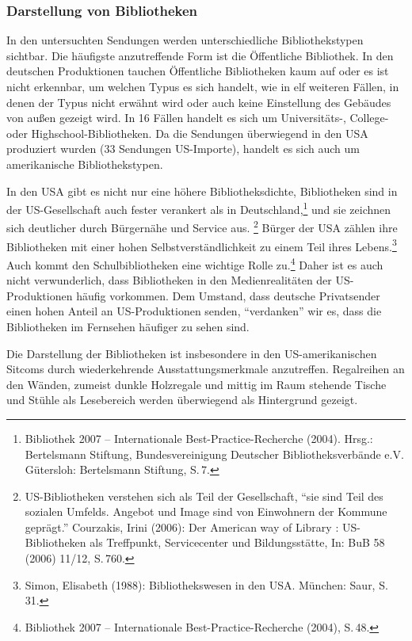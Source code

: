 \subsubsection{Darstellung von
Bibliotheken}\label{darstellung-von-bibliotheken}

In den untersuchten Sendungen werden unterschiedliche Bibliothekstypen
sichtbar. Die häufigste anzutreffende Form ist die Öffentliche
Bibliothek. In den deutschen Produktionen tauchen Öffentliche
Bibliotheken kaum auf oder es ist nicht erkennbar, um welchen Typus es
sich handelt, wie in elf weiteren Fällen, in denen der Typus nicht
erwähnt wird oder auch keine Einstellung des Gebäudes von außen gezeigt
wird. In 16 Fällen handelt es sich um Universitäts-, College- oder
Highschool-Bibliotheken. Da die Sendungen überwiegend in den USA
produziert wurden (33 Sendungen US-Importe), handelt es sich auch um
amerikanische Bibliothekstypen.

In den USA gibt es nicht nur eine höhere Bibliotheksdichte, Bibliotheken
sind in der US-Gesellschaft auch fester verankert als in
Deutschland,\footnote{Bibliothek 2007 -- Internationale
  Best-Practice-Recherche (2004). Hrsg.: Bertelsmann Stiftung,
  Bundesvereinigung Deutscher Bibliotheksverbände e.V. Gütersloh:
  Bertelsmann Stiftung, S.\,7.} und sie zeichnen sich deutlicher durch
Bürgernähe und Service aus. \footnote{US-Bibliotheken verstehen sich als
  Teil der Gesellschaft, \enquote{sie sind Teil des sozialen Umfelds.
  Angebot und Image sind von Einwohnern der Kommune geprägt.} Courzakis,
  Irini (2006): Der American way of Library : US-Bibliotheken als
  Treffpunkt, Servicecenter und Bildungsstätte, In: BuB 58 (2006) 11/12,
  S.\,760.} Bürger der USA zählen ihre Bibliotheken mit einer hohen
Selbstverständlichkeit zu einem Teil ihres Lebens.\footnote{Simon,
  Elisabeth (1988): Bibliothekswesen in den USA. München: Saur, S.\,31.}
Auch kommt den Schulbibliotheken eine wichtige Rolle zu.\footnote{Bibliothek
  2007 -- Internationale Best-Practice-Recherche (2004), S.\,48.} Daher
ist es auch nicht verwunderlich, dass Bibliotheken in den
Medienrealitäten der US-Produktionen häufig vorkommen. Dem Umstand, dass
deutsche Privatsender einen hohen Anteil an US-Produktionen senden,
\enquote{verdanken} wir es, dass die Bibliotheken im Fernsehen häufiger
zu sehen sind.

Die Darstellung der Bibliotheken ist insbesondere in den
US-amerikanischen Sitcoms durch wiederkehrende Ausstattungsmerkmale
anzutreffen. Regalreihen an den Wänden, zumeist dunkle Holzregale und
mittig im Raum stehende Tische und Stühle als Lesebereich werden
überwiegend als Hintergrund gezeigt.

